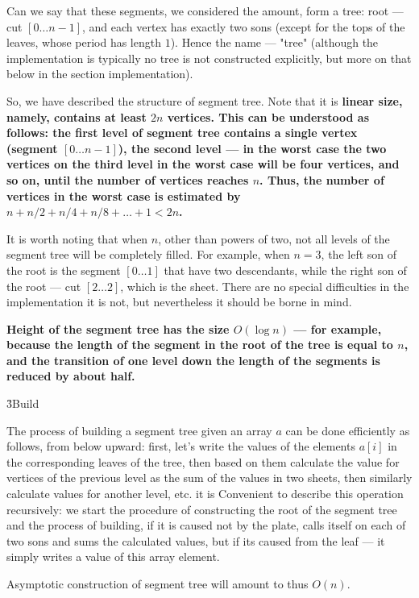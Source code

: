 Can we say that these segments, we considered the amount, form a tree: root --- cut $[0 \ldots n-1]$, and each vertex has exactly two sons (except for the tops of the leaves, whose period has length $1$). Hence the name --- "tree" (although the implementation is typically no tree is not constructed explicitly, but more on that below in the section implementation).

So, we have described the structure of segment tree. Note that it is \bf{linear size}, namely, contains at least $2n$ vertices. This can be understood as follows: the first level of segment tree contains a single vertex (segment $[0 \ldots n-1]$), the second level --- in the worst case the two vertices on the third level in the worst case will be four vertices, and so on, until the number of vertices reaches $n$. Thus, the number of vertices in the worst case is estimated by $n + n/2 + n/4 + n/8 + \ldots + 1 < 2n$.

It is worth noting that when $n$, other than powers of two, not all levels of the segment tree will be completely filled. For example, when $n=3$, the left son of the root is the segment $[0 \ldots 1]$ that have two descendants, while the right son of the root --- cut $[2 \ldots 2]$, which is the sheet. There are no special difficulties in the implementation it is not, but nevertheless it should be borne in mind.

\bf{Height} of the segment tree has the size $O (\log n)$ --- for example, because the length of the segment in the root of the tree is equal to $n$, and the transition of one level down the length of the segments is reduced by about half.


\h3{Build}

The process of building a segment tree given an array $a$ can be done efficiently as follows, from below upward: first, let's write the values of the elements $a[i]$ in the corresponding leaves of the tree, then based on them calculate the value for vertices of the previous level as the sum of the values in two sheets, then similarly calculate values for another level, etc. it is Convenient to describe this operation recursively: we start the procedure of constructing the root of the segment tree and the process of building, if it is caused not by the plate, calls itself on each of two sons and sums the calculated values, but if its caused from the leaf --- it simply writes a value of this array element.

Asymptotic construction of segment tree will amount to thus $O(n)$.


